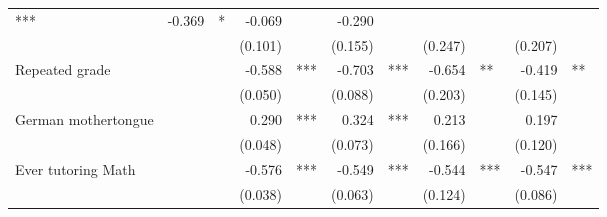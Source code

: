 \documentclass{article}
\begin{document}
\begin{table}[!h]
\begin{tabular}{lllllllllll}
  \multicolumn{1}{l}{***} &
  \multicolumn{1}{r}{-0.369} &
  \multicolumn{1}{l}{*} &
  \multicolumn{1}{r}{-0.069} &
  \multicolumn{1}{l}{} &
  \multicolumn{1}{r}{-0.290} &
  \multicolumn{1}{l}{} \\
\multicolumn{1}{l}{} &
  \multicolumn{1}{r}{} &
  \multicolumn{1}{l}{} &
  \multicolumn{1}{r}{(0.101)} &
  \multicolumn{1}{l}{} &
  \multicolumn{1}{r}{(0.155)} &
  \multicolumn{1}{l}{} &
  \multicolumn{1}{r}{(0.247)} &
  \multicolumn{1}{l}{} &
  \multicolumn{1}{r}{(0.207)} &
  \multicolumn{1}{l}{} \\
\multicolumn{1}{l}{Repeated grade} &
  \multicolumn{1}{r}{} &
  \multicolumn{1}{l}{} &
  \multicolumn{1}{r}{-0.588} &
  \multicolumn{1}{l}{***} &
  \multicolumn{1}{r}{-0.703} &
  \multicolumn{1}{l}{***} &
  \multicolumn{1}{r}{-0.654} &
  \multicolumn{1}{l}{**} &
  \multicolumn{1}{r}{-0.419} &
  \multicolumn{1}{l}{**} \\
\multicolumn{1}{l}{} &
  \multicolumn{1}{r}{} &
  \multicolumn{1}{l}{} &
  \multicolumn{1}{r}{(0.050)} &
  \multicolumn{1}{l}{} &
  \multicolumn{1}{r}{(0.088)} &
  \multicolumn{1}{l}{} &
  \multicolumn{1}{r}{(0.203)} &
  \multicolumn{1}{l}{} &
  \multicolumn{1}{r}{(0.145)} &
  \multicolumn{1}{l}{} \\
\multicolumn{1}{l}{German mothertongue} &
  \multicolumn{1}{r}{} &
  \multicolumn{1}{l}{} &
  \multicolumn{1}{r}{0.290} &
  \multicolumn{1}{l}{***} &
  \multicolumn{1}{r}{0.324} &
  \multicolumn{1}{l}{***} &
  \multicolumn{1}{r}{0.213} &
  \multicolumn{1}{l}{} &
  \multicolumn{1}{r}{0.197} &
  \multicolumn{1}{l}{} \\
\multicolumn{1}{l}{} &
  \multicolumn{1}{r}{} &
  \multicolumn{1}{l}{} &
  \multicolumn{1}{r}{(0.048)} &
  \multicolumn{1}{l}{} &
  \multicolumn{1}{r}{(0.073)} &
  \multicolumn{1}{l}{} &
  \multicolumn{1}{r}{(0.166)} &
  \multicolumn{1}{l}{} &
  \multicolumn{1}{r}{(0.120)} &
  \multicolumn{1}{l}{} \\
\multicolumn{1}{l}{Ever tutoring Math} &
  \multicolumn{1}{r}{} &
  \multicolumn{1}{l}{} &
  \multicolumn{1}{r}{-0.576} &
  \multicolumn{1}{l}{***} &
  \multicolumn{1}{r}{-0.549} &
  \multicolumn{1}{l}{***} &
  \multicolumn{1}{r}{-0.544} &
  \multicolumn{1}{l}{***} &
  \multicolumn{1}{r}{-0.547} &
  \multicolumn{1}{l}{***} \\
\multicolumn{1}{l}{} &
  \multicolumn{1}{r}{} &
  \multicolumn{1}{l}{} &
  \multicolumn{1}{r}{(0.038)} &
  \multicolumn{1}{l}{} &
  \multicolumn{1}{r}{(0.063)} &
  \multicolumn{1}{l}{} &
  \multicolumn{1}{r}{(0.124)} &
  \multicolumn{1}{l}{} &
  \multicolumn{1}{r}{(0.086)} &

\end{tabular}
\end{table}
\end{document}

